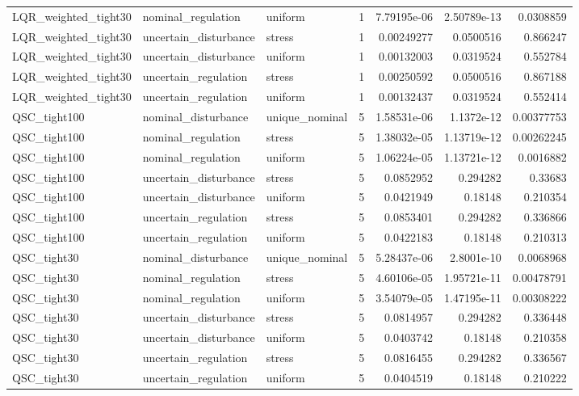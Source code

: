 \begin{tabular}{llllrrr}
LQR\_weighted\_tight30 & nominal\_regulation & uniform & 1 & 7.79195e-06 & 2.50789e-13 & 0.0308859 \\
LQR\_weighted\_tight30 & uncertain\_disturbance & stress & 1 & 0.00249277 & 0.0500516 & 0.866247 \\
LQR\_weighted\_tight30 & uncertain\_disturbance & uniform & 1 & 0.00132003 & 0.0319524 & 0.552784 \\
LQR\_weighted\_tight30 & uncertain\_regulation & stress & 1 & 0.00250592 & 0.0500516 & 0.867188 \\
LQR\_weighted\_tight30 & uncertain\_regulation & uniform & 1 & 0.00132437 & 0.0319524 & 0.552414 \\
QSC\_tight100 & nominal\_disturbance & unique\_nominal & 5 & 1.58531e-06 & 1.1372e-12 & 0.00377753 \\
QSC\_tight100 & nominal\_regulation & stress & 5 & 1.38032e-05 & 1.13719e-12 & 0.00262245 \\
QSC\_tight100 & nominal\_regulation & uniform & 5 & 1.06224e-05 & 1.13721e-12 & 0.0016882 \\
QSC\_tight100 & uncertain\_disturbance & stress & 5 & 0.0852952 & 0.294282 & 0.33683 \\
QSC\_tight100 & uncertain\_disturbance & uniform & 5 & 0.0421949 & 0.18148 & 0.210354 \\
QSC\_tight100 & uncertain\_regulation & stress & 5 & 0.0853401 & 0.294282 & 0.336866 \\
QSC\_tight100 & uncertain\_regulation & uniform & 5 & 0.0422183 & 0.18148 & 0.210313 \\
QSC\_tight30 & nominal\_disturbance & unique\_nominal & 5 & 5.28437e-06 & 2.8001e-10 & 0.0068968 \\
QSC\_tight30 & nominal\_regulation & stress & 5 & 4.60106e-05 & 1.95721e-11 & 0.00478791 \\
QSC\_tight30 & nominal\_regulation & uniform & 5 & 3.54079e-05 & 1.47195e-11 & 0.00308222 \\
QSC\_tight30 & uncertain\_disturbance & stress & 5 & 0.0814957 & 0.294282 & 0.336448 \\
QSC\_tight30 & uncertain\_disturbance & uniform & 5 & 0.0403742 & 0.18148 & 0.210358 \\
QSC\_tight30 & uncertain\_regulation & stress & 5 & 0.0816455 & 0.294282 & 0.336567 \\
QSC\_tight30 & uncertain\_regulation & uniform & 5 & 0.0404519 & 0.18148 & 0.210222 \\
\hline
\end{tabular}
